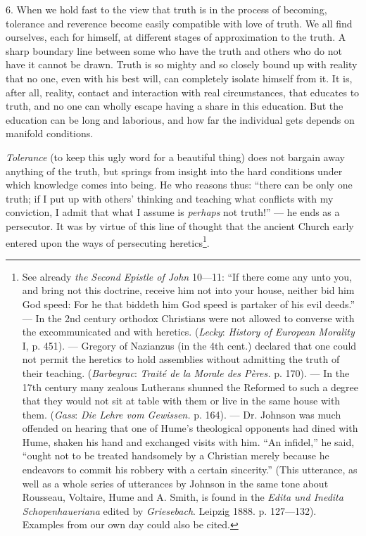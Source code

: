 \documentclass[12pt,a4paper,openany]{book}
\begin{document}
6. When we hold fast to the view that truth is in the process of becoming, tolerance and reverence %
become easily compatible with love of truth. We all find ourselves, each for himself, at different stages of
approximation to the truth. A sharp boundary line between some who have the truth and others who do not have it cannot
be drawn. Truth is so mighty and so closely bound up with reality that no one, even with his best will, can completely
isolate himself from it. It is, after all, reality, contact and interaction with real circumstances, that educates to
truth, and no one can wholly escape having a share in this education. But the education can be long and laborious, and
how far the individual gets depends on manifold conditions.

\textit{Tolerance} (to keep this ugly word for a beautiful thing) does not bargain away anything of the truth, but
springs from insight into the hard conditions under which knowledge comes into being. He who reasons thus: ``there can
be only one truth; if I put up with others' thinking and teaching what conflicts with my conviction, I admit that what I
assume is \textit{perhaps} not truth!'' --- he ends as a persecutor. It was by virtue of this line of thought that the
ancient Church early entered upon the ways of persecuting heretics\footnote[1]{See already \textit{the Second Epistle of
John} 10---11: ``If there come any unto you, and bring not this doctrine, receive him not into your house, neither bid
him God speed: For he that biddeth him God speed is partaker of his evil deeds.'' %
--- In the 2nd century orthodox Christians were not allowed to converse with the excommunicated and with heretics.
(\emph{Lecky}: \textit{History of European Morality} I, p. 451). --- Gregory of Nazianzus (in the 4th cent.) declared
that one could not permit the heretics to hold assemblies without admitting the truth of their teaching.
(\emph{Barbeyrac}: \textit{Traité de la Morale des Pères.} p. 170). --- In the 17th century many zealous Lutherans
shunned the Reformed to such a degree that they would not sit at table with them or live in the same house with them.
(\emph{Gass}: \textit{Die Lehre vom Gewissen.} p. 164). --- Dr. Johnson was much offended on hearing that one of Hume's
theological opponents had dined with Hume, shaken his hand and exchanged visits with him. ``An infidel,'' he said,
``ought not to be treated handsomely by a Christian merely because he endeavors to commit his robbery with a certain
sincerity.'' %
(This utterance, as well as a whole series of utterances by Johnson in the same tone about Rousseau, Voltaire, Hume and
A. Smith, is found in the \textit{Edita und Inedita Schopenhaueriana} edited by \emph{Griesebach}. %
Leipzig 1888. p. 127---132). Examples from our own day could also be cited.}.
\end{document}
